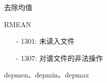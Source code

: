 \label{cmd:rmean}

去除均值

\begin{SACSTX}
RMEAN
\end{SACSTX}

\begin{itemize}
\item[-]1301: 未读入文件
\item[-]1307: 对谱文件的非法操作
\end{itemize}

depmen、depmin、depmax
